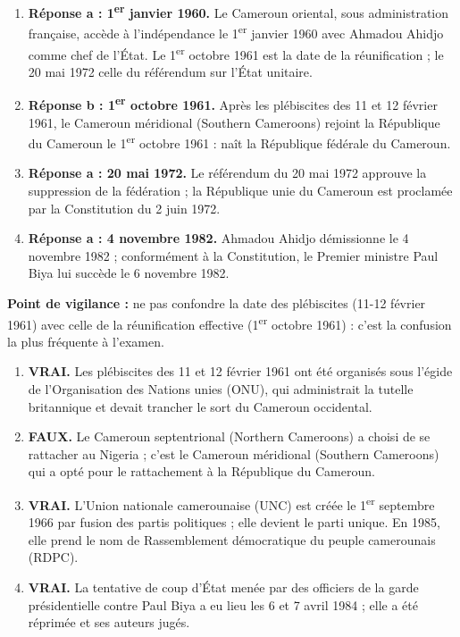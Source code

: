 \documentclass[11pt]{article}
\begin{document}
\begin{corrige}
\begin{enumerate}
\item \textbf{Réponse a : 1\textsuperscript{er} janvier 1960.} Le Cameroun oriental, sous administration française, accède à l'indépendance le 1\textsuperscript{er} janvier 1960 avec Ahmadou Ahidjo comme chef de l'État. Le 1\textsuperscript{er} octobre 1961 est la date de la réunification ; le 20 mai 1972 celle du référendum sur l'État unitaire.
\item \textbf{Réponse b : 1\textsuperscript{er} octobre 1961.} Après les plébiscites des 11 et 12 février 1961, le Cameroun méridional (Southern Cameroons) rejoint la République du Cameroun le 1\textsuperscript{er} octobre 1961 : naît la République fédérale du Cameroun.
\item \textbf{Réponse a : 20 mai 1972.} Le référendum du 20 mai 1972 approuve la suppression de la fédération ; la République unie du Cameroun est proclamée par la Constitution du 2 juin 1972.
\item \textbf{Réponse a : 4 novembre 1982.} Ahmadou Ahidjo démissionne le 4 novembre 1982 ; conformément à la Constitution, le Premier ministre Paul Biya lui succède le 6 novembre 1982.
\end{enumerate}
\textbf{Point de vigilance :} ne pas confondre la date des plébiscites (11-12 février 1961) avec celle de la réunification effective (1\textsuperscript{er} octobre 1961) : c'est la confusion la plus fréquente à l'examen.
\end{corrige}

\begin{corrige}
\begin{enumerate}
\item \textbf{VRAI.} Les plébiscites des 11 et 12 février 1961 ont été organisés sous l'égide de l'Organisation des Nations unies (ONU), qui administrait la tutelle britannique et devait trancher le sort du Cameroun occidental.
\item \textbf{FAUX.} Le Cameroun septentrional (Northern Cameroons) a choisi de se rattacher au Nigeria ; c'est le Cameroun méridional (Southern Cameroons) qui a opté pour le rattachement à la République du Cameroun.
\item \textbf{VRAI.} L'Union nationale camerounaise (UNC) est créée le 1\textsuperscript{er} septembre 1966 par fusion des partis politiques ; elle devient le parti unique. En 1985, elle prend le nom de Rassemblement démocratique du peuple camerounais (RDPC).
\item \textbf{VRAI.} La tentative de coup d'État menée par des officiers de la garde présidentielle contre Paul Biya a eu lieu les 6 et 7 avril 1984 ; elle a été réprimée et ses auteurs jugés.
\end{enumerate}
\end{corrige}
\end{document}
